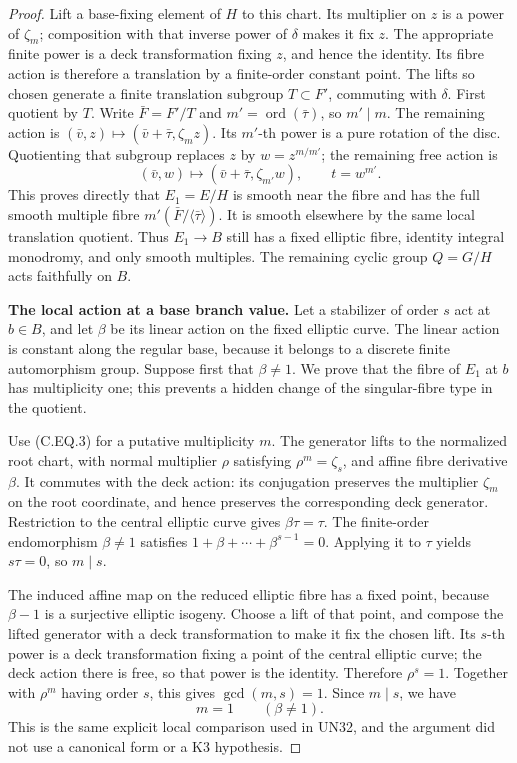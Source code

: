 \begin{proof}
Lift a base-fixing element of $H$ to this chart.
Its multiplier on $z$ is a power of $\zeta_m$;
composition with that inverse power of $\delta$
makes it fix $z$. The appropriate finite power
is a deck transformation fixing $z$, and hence
the identity. Its fibre action is therefore a
translation by a finite-order constant point.
The lifts so chosen generate a finite translation
subgroup $T\subset F'$, commuting with $\delta$.
First quotient by $T$. Write $\bar F=F'/T$ and
$m'=\operatorname{ord}(\bar\tau)$, so $m'\mid m$.
The remaining action is
$(\bar v,z)\mapsto(\bar v+\bar\tau,\zeta_m z)$.
Its $m'$-th power is a pure rotation of the disc.
Quotienting that subgroup replaces $z$ by
$w=z^{m/m'}$; the remaining free action is
\[
 (\bar v,w)\longmapsto(\bar v+\bar\tau,\zeta_{m'}w),
 \qquad t=w^{m'}.                                    \tag{C.EQ.4}
\]
This proves directly that $E_1=E/H$ is smooth near
the fibre and has the full smooth multiple fibre
$m'(\bar F/\langle\bar\tau\rangle)$. It is smooth
elsewhere by the same local translation quotient.
Thus $E_1\to B$ still has a fixed elliptic fibre,
identity integral monodromy, and only smooth multiples.
The remaining cyclic group $Q=G/H$ acts faithfully
on $B$.

\par\medskip\noindent\textbf{The local action at a base branch value.}
Let a stabilizer of order $s$ act at $b\in B$, and
let $\beta$ be its linear action on the fixed elliptic
curve. The linear action is constant along the regular
base, because it belongs to a discrete finite automorphism
group. Suppose first that $\beta\ne1$.
We prove that the fibre of $E_1$ at $b$ has multiplicity
one; this prevents a hidden change of the singular-fibre
type in the quotient.

Use (C.EQ.3) for a putative multiplicity $m$.
The generator lifts to the normalized root chart,
with normal multiplier $\rho$ satisfying
$\rho^m=\zeta_s$, and affine fibre derivative $\beta$.
It commutes with the deck action: its conjugation
preserves the multiplier $\zeta_m$ on the root
coordinate, and hence preserves the corresponding
deck generator. Restriction to the central elliptic
curve gives $\beta\tau=\tau$. The finite-order
endomorphism $\beta\ne1$ satisfies
$1+\beta+\cdots+\beta^{s-1}=0$. Applying it to
$\tau$ yields $s\tau=0$, so $m\mid s$.

The induced affine map on the reduced elliptic
fibre has a fixed point, because $\beta-1$ is a
surjective elliptic isogeny. Choose a lift of that
point, and compose the lifted generator with a
deck transformation to make it fix the chosen
lift. Its $s$-th power is a deck transformation
fixing a point of the central elliptic curve;
the deck action there is free, so that power is
the identity. Therefore $\rho^s=1$.
Together with $\rho^m$ having order $s$, this
gives $\gcd(m,s)=1$. Since $m\mid s$, we have
\[
                 m=1\qquad(\beta\ne1).               \tag{C.EQ.5}
\]
This is the same explicit local comparison used
in UN32, and the argument did not use a canonical
form or a K3 hypothesis.


\end{proof}
